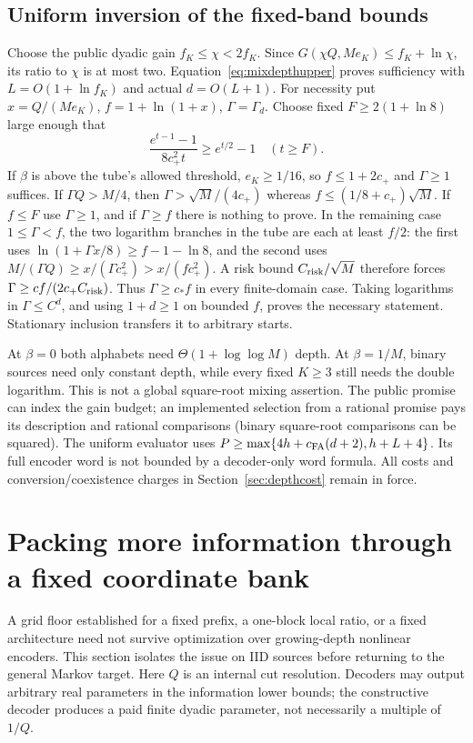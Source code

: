\documentclass[11pt,letterpaper]{article}
\theoremstyle{definition}\newtheorem{definition}[theorem]{Definition}
\theoremstyle{remark}\newtheorem{remark}[theorem]{Remark}
\begin{document}
\subsection{Uniform inversion of the fixed-band bounds}
Choose the public dyadic gain $f_K\le\chi<2f_K$. Since
$G(\chi Q,Me_K)\le f_K+\ln\chi$, its ratio to $\chi$ is at most two. Equation~\eqref{eq:mixdepthupper} proves sufficiency with $L=O(1+\ln f_K)$ and actual $d=O(L+1)$.
For necessity put $x=Q/(Me_K)$, $f=1+\ln(1+x)$, $\Gamma=\Gamma_d$. Choose fixed $F\ge2(1+\ln8)$ large enough that
\[
 \frac{e^{t-1}-1}{8c_+^2t}\ge e^{t/2}-1\quad(t\ge F).
\]
If $\beta$ is above the tube's allowed threshold, $e_K\ge1/16$, so $f\le1+2c_+$ and $\Gamma\ge1$ suffices. If $\Gamma Q>M/4$, then $\Gamma>\sqrt M/(4c_+)$ whereas $f\le(1/8+c_+)\sqrt M$. If $f\le F$ use $\Gamma\ge1$, and if $\Gamma\ge f$ there is nothing to prove. In the remaining case $1\le\Gamma<f$, the two logarithm branches in the tube are each at least $f/2$: the first uses $\ln(1+\Gamma x/8)\ge f-1-\ln8$, and the second uses
$M/(\Gamma Q)\ge x/(\Gamma c_+^2)>x/(fc_+^2)$.
A risk bound $C_{\rm risk}/\sqrt M$ therefore forces
$\Gamma\ge cf/(2c_+C_{\rm risk})$.
Thus $\Gamma\ge c_*f$ in every finite-domain case. Taking logarithms in $\Gamma\le C^d$, and using $1+d\ge1$ on bounded $f$, proves the necessary statement. Stationary inclusion transfers it to arbitrary starts.

At $\beta=0$ both alphabets need $\Theta(1+\log\log M)$ depth. At $\beta=1/M$, binary sources need only constant depth, while every fixed $K\ge3$ still needs the double logarithm. This is not a global square-root mixing assertion. The public promise can index the gain budget; an implemented selection from a rational promise pays its description and rational comparisons (binary square-root comparisons can be squared). The uniform evaluator uses $P\ge\max\{4h+c_{\rm FA}(d+2),h+L+4\}$. Its full encoder word is not bounded by a decoder-only word formula. All costs and conversion/coexistence charges in Section~\ref{sec:depthcost} remain in force.

\section{Packing more information through a fixed coordinate bank}\label{sec:iidpacking}
A grid floor established for a fixed prefix, a one-block local ratio, or a fixed architecture need not survive optimization over growing-depth nonlinear encoders. This section isolates the issue on IID sources before returning to the general Markov target. Here $Q$ is an internal cut resolution. Decoders may output arbitrary real parameters in the information lower bounds; the constructive decoder produces a paid finite dyadic parameter, not necessarily a multiple of $1/Q$.
\end{document}
